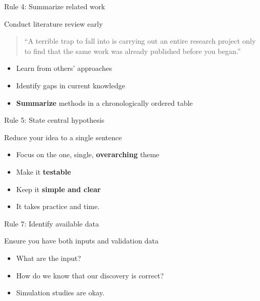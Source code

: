 \documentclass[
  12pt,
  ignorenonframetext,
  aspectratio=169]{beamer}
\providecommand{\tightlist}{%
  \setlength{\itemsep}{0pt}\setlength{\parskip}{0pt}}
\begin{document}
\begin{frame}{Rule 4: Summarize related work}
\protect{}\label{rule-4-summarize-related-work}
\Large

Conduct literature review early

\normalsize

\vfill

\begin{quote}
``A terrible trap to fall into is carrying out an entire research
project only to find that the same work was already published before you
began.''
\end{quote}

\begin{itemize}
\item
  Learn from others' approaches
\item
  Identify gaps in current knowledge
\item
  \textbf{Summarize} methods in a chronologically ordered table
\end{itemize}
\end{frame}

\begin{frame}{Rule 5: State central hypothesis}
\protect{}\label{rule-5-state-central-hypothesis}
\Large

Reduce your idea to a single sentence

\large

\vfill

\begin{itemize}
\item
  Focus on the one, single, \textbf{overarching} theme
\item
  Make it \textbf{testable}
\item
  Keep it \textbf{simple and clear}
\end{itemize}

\vfill

\normalsize

\begin{itemize}
\tightlist
\item
  It takes practice and time.
\end{itemize}
\end{frame}

\begin{frame}{Rule 7: Identify available data}
\protect{}\label{rule-7-identify-available-data}
\Large

Ensure you have both inputs and validation data

\normalsize

\vfill

\begin{itemize}
\item
  What are the input?
\item
  How do we know that our discovery is correct?
\item
  Simulation studies are okay.
\end{itemize}
\end{frame}
\end{document}
